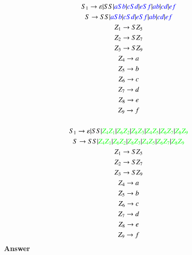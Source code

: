 \documentclass[12pt,letterpaper]{article}
\begin{document}
		\begin{gather*}
			S_1\rightarrow \varepsilon\arrowvert SS\arrowvert \textcolor{blue}{aSb}\arrowvert\textcolor{blue}{cSd}\arrowvert \textcolor{blue}{eSf}\arrowvert\textcolor{blue}{ab}\arrowvert \textcolor{blue}{cd}\arrowvert\textcolor{blue}{ef}\\
			S \rightarrow SS\arrowvert \textcolor{blue}{aSb}\arrowvert \textcolor{blue}{cSd}\arrowvert \textcolor{blue}{eSf}\arrowvert 	\textcolor{blue}{ab}\arrowvert \textcolor{blue}{cd}\arrowvert \textcolor{blue}{ef}\\
			Z_1\rightarrow SZ_5\\
			Z_2\rightarrow SZ_7\\
			Z_3\rightarrow SZ_9\\
			Z_4\rightarrow a\\
			Z_5\rightarrow b\\
			Z_6\rightarrow c\\
			Z_7\rightarrow d\\
			Z_8\rightarrow e\\
			Z_9\rightarrow f\\
			\\S_1\rightarrow \varepsilon\arrowvert SS\arrowvert \textcolor{green}{Z_4Z_1}\arrowvert \textcolor{green}{Z_6Z_2}\arrowvert \textcolor{green}{Z_8Z_3}\arrowvert \textcolor{green}{Z_4Z_5}\arrowvert \textcolor{green}{Z_6Z_7}\arrowvert \textcolor{green}{Z_8Z_9}\\
			S\rightarrow SS\arrowvert \textcolor{green}{Z_4Z_1}\arrowvert \textcolor{green}{Z_6Z_2}\arrowvert \textcolor{green}{Z_8Z_3}\arrowvert \textcolor{green}{Z_4Z_5}\arrowvert \textcolor{green}{Z_6Z_7}\arrowvert \textcolor{green}{Z_8Z_9}\\
			Z_1\rightarrow SZ_5\\
			Z_2\rightarrow SZ_7\\
			Z_3\rightarrow SZ_9\\
			Z_4\rightarrow a\\
			Z_5\rightarrow b\\
			Z_6\rightarrow c\\
			Z_7\rightarrow d\\
			Z_8\rightarrow e\\
			Z_9\rightarrow f\\
		\end{gather*}
		\textbf{Answer}
\end{document}
